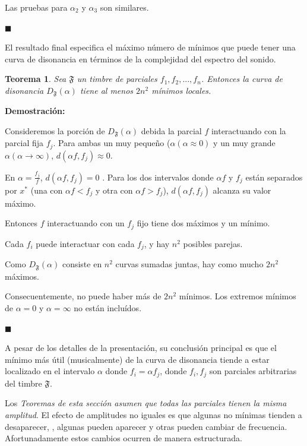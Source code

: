 \documentclass[11pt,a4paper]{article}
\newtheorem{teor}{Teorema}
\begin{document}
Las pruebas para $\alpha_2$ y $\alpha_3$ son similares.

$\blacksquare$

El resultado final especifica el máximo número de mínimos que puede tener una curva de disonancia en términos de la complejidad del espectro del sonido.


	\begin{teor}                      %
	Sea $\mathfrak{F}$ un timbre de parciales $f_1, f_2,... , f_n$. Entonces la curva de disonancia $D_{\mathfrak{F}}(\alpha)$ tiene al menos $2 n^{2}$ mínimos locales.
	\end{teor}
	
	\noindent\textbf{Demostración:} 

Consideremos la porción de $D_{\mathfrak{F}}(\alpha)$ debida  la parcial $f$ interactuando con la parcial fija $f_j$. Para ambas un muy pequeño ($\alpha (\alpha \approx 0)$ y un muy grande $\alpha (\alpha \rightarrow \infty)$, $d(\alpha f, f_j) \approx 0$.

En $\alpha = \frac{f_j}{f}$, $d(\alpha f, f_j) = 0$ . Para los dos intervalos donde $ \alpha f $ y $ f_j $ están separados por $ x^{*}$ (una con $ \alpha f < f_j $ y otra con $ \alpha f > f_j$), $d(\alpha f, f_j)$ alcanza su valor máximo.

Entonces $f$ interactuando con un $f_j$ fijo tiene dos máximos y un mínimo.

Cada $f_i$ puede interactuar con cada $f_j$, y hay $n^2$ posibles parejas.
 
Como $D_{\mathfrak{F}}(\alpha)$ consiste en $n^2$ curvas sumadas juntas, hay como mucho $2n^2$ máximos.

Consecuentemente, no puede haber más de $2n^2$ mínimos. Los extremos mínimos de $\alpha = 0$ y $\alpha = \infty$ no están incluídos.

$\blacksquare$

A pesar de los detalles de la presentación, su conclusión principal es que el mínimo más útil (musicalmente) de la curva de disonancia tiende a estar localizado en el intervalo $\alpha$ donde $f_i = \alpha f_j$, donde $f_i, f_j$ son parciales arbitrarias del timbre $	\mathfrak{F}$.

Los \emph{Teoremas de esta sección asumen que todas las parciales tienen la misma amplitud}. El efecto de amplitudes no iguales es que algunas no mínimas tienden a desaparecer, , algunas pueden aparecer y otras pueden cambiar de frecuencia. Afortunadamente estos cambios ocurren de manera estructurada.
\end{document}
